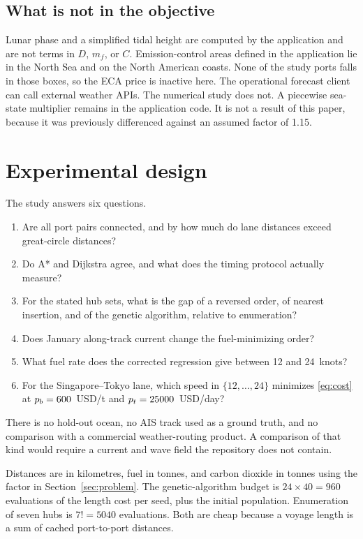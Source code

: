 \documentclass[11pt]{article}
\begin{document}
\subsection{What is not in the objective}
Lunar phase and a simplified tidal height are computed by the application and are not terms in \(D\), \(m_f\), or \(C\).
Emission-control areas defined in the application lie in the North Sea and on the North American coasts.
None of the study ports falls in those boxes, so the ECA price is inactive here.
The operational forecast client can call external weather APIs.
The numerical study does not.
A piecewise sea-state multiplier remains in the application code.
It is not a result of this paper, because it was previously differenced against an assumed factor of 1.15.

\section{Experimental design}
\label{sec:design}

The study answers six questions.
\begin{enumerate}
\item Are all port pairs connected, and by how much do lane distances exceed great-circle distances?
\item Do A* and Dijkstra agree, and what does the timing protocol actually measure?
\item For the stated hub sets, what is the gap of a reversed order, of nearest insertion, and of the genetic algorithm, relative to enumeration?
\item Does January along-track current change the fuel-minimizing order?
\item What fuel rate does the corrected regression give between 12 and 24~knots?
\item For the Singapore--Tokyo lane, which speed in \(\{12,\ldots,24\}\) minimizes \eqref{eq:cost} at \(p_b=600\)~USD/t and \(p_t=25000\)~USD/day?
\end{enumerate}
There is no hold-out ocean, no AIS track used as a ground truth, and no comparison with a commercial weather-routing product.
A comparison of that kind would require a current and wave field the repository does not contain.

Distances are in kilometres, fuel in tonnes, and carbon dioxide in tonnes using the factor in Section~\ref{sec:problem}.
The genetic-algorithm budget is \(24\times 40=960\) evaluations of the length cost per seed, plus the initial population.
Enumeration of seven hubs is \(7!=5040\) evaluations.
Both are cheap because a voyage length is a sum of cached port-to-port distances.
\end{document}
